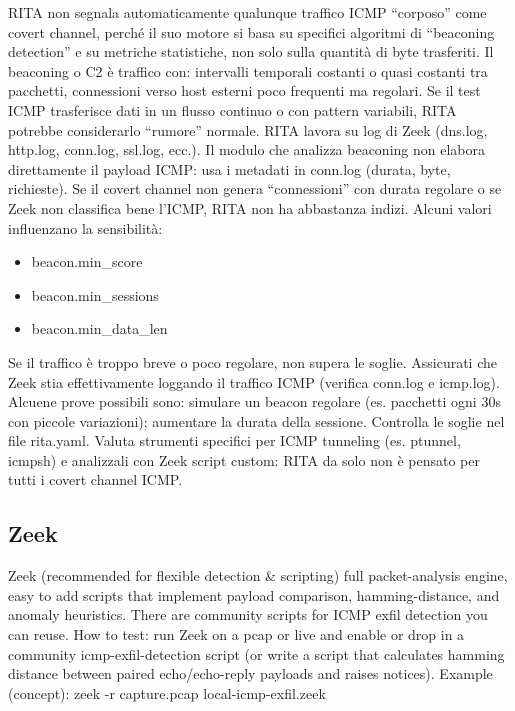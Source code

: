 RITA non segnala automaticamente qualunque traffico ICMP “corposo” come covert channel, perché il suo motore 
si basa su specifici algoritmi di “beaconing detection” e su metriche statistiche, non solo sulla quantità di 
byte trasferiti.
\vspace{1ex} \newline 
Il beaconing o C2 è traffico con: intervalli temporali costanti o quasi costanti tra pacchetti, 
connessioni verso host esterni poco frequenti ma regolari.
Se il test ICMP trasferisce dati in un flusso continuo o con pattern variabili, RITA potrebbe considerarlo “rumore” normale.
\vspace{1ex} \newline 
RITA lavora su log di Zeek (dns.log, http.log, conn.log, ssl.log, ecc.).
Il modulo che analizza beaconing non elabora direttamente il payload ICMP: 
usa i metadati in conn.log (durata, byte, richieste).
Se il covert channel non genera “connessioni” con durata regolare o se Zeek non classifica bene l’ICMP, 
RITA non ha abbastanza indizi.
\vspace{1ex} \newline 
Alcuni valori influenzano la sensibilità:  
\begin{itemize}
    \item beacon.min\_score 
    \item beacon.min\_sessions 
    \item beacon.min\_data\_len 
\end{itemize}
Se il traffico è troppo breve o poco regolare, non supera le soglie.
\vspace{1ex} \newline 
Assicurati che Zeek stia effettivamente loggando il traffico ICMP (verifica conn.log e icmp.log). 
Alcuene prove possibili sono: 
simulare un beacon regolare (es. pacchetti ogni 30s con piccole variazioni); aumentare la durata della sessione. 
\vspace{1ex} \newline 
Controlla le soglie nel file rita.yaml. 
Valuta strumenti specifici per ICMP tunneling (es. ptunnel, icmpsh) e analizzali con Zeek script custom: 
RITA da solo non è pensato per tutti i covert channel ICMP.


\subsection{Zeek} 
Zeek (recommended for flexible detection \& scripting)
full packet-analysis engine, easy to add scripts that implement payload comparison, hamming-distance, 
and anomaly heuristics. There are community scripts for ICMP exfil detection you can reuse.
%
How to test: run Zeek on a pcap or live and enable or drop in a community icmp-exfil-detection script 
(or write a script that calculates hamming distance between paired echo/echo-reply payloads and raises notices).
%
Example (concept): zeek -r capture.pcap local-icmp-exfil.zeek

